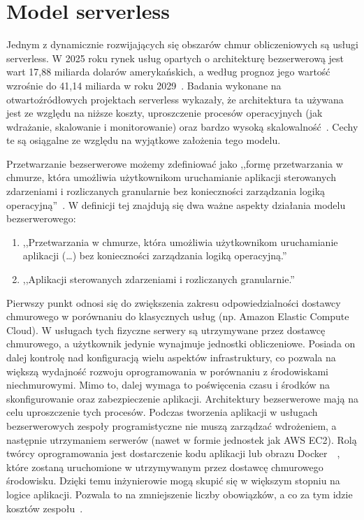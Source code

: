 \label{chapter:wstep}

\section{Model serverless}\label{chapter:model_serverless}
Jednym z dynamicznie rozwijających się obszarów chmur obliczeniowych są usługi serverless. W 2025 roku rynek usług opartych o architekturę bezserwerową jest wart 17,88 miliarda dolarów amerykańskich, a według prognoz jego wartość wzrośnie do 41,14 miliarda w roku 2029~\cite{serverlessArchitectureMarketReport}. Badania wykonane na otwartoźródłowych projektach serverless wykazały, że architektura ta używana jest ze względu na niższe koszty, uproszczenie procesów operacyjnych (jak wdrażanie, skalowanie i monitorowanie) oraz bardzo wysoką skalowalność~\cite{ServerlessApplicationsWhyWhenAndHow}. Cechy te są osiągalne ze względu na wyjątkowe założenia tego modelu.

Przetwarzanie bezserwerowe możemy zdefiniować jako ,,formę przetwarzania w chmurze, która umożliwia użytkownikom uruchamianie aplikacji sterowanych zdarzeniami i rozliczanych granularnie bez konieczności zarządzania logiką operacyjną''~\cite{SpecRgCloudGroupVisionOnThePerformanceChallengesOfFaas}. W definicji tej znajdują się dwa ważne aspekty działania modelu bezserwerowego:

\begin{enumerate}
    \item ,,Przetwarzania w chmurze, która umożliwia użytkownikom uruchamianie aplikacji (\dots) bez konieczności zarządzania logiką operacyjną.''
    \item ,,Aplikacji sterowanych zdarzeniami i rozliczanych granularnie.''
\end{enumerate}

Pierwszy punkt odnosi się do zwiększenia zakresu odpowiedzialności dostawcy chmurowego w porównaniu do klasycznych usług (np. Amazon Elastic Compute Cloud). W usługach tych fizyczne serwery są utrzymywane przez dostawcę chmurowego, a użytkownik jedynie wynajmuje jednostki obliczeniowe. Posiada on dalej kontrolę nad konfiguracją wielu aspektów infrastruktury, co pozwala na większą wydajność rozwoju oprogramowania w porównaniu z środowiskami niechmurowymi. Mimo to, dalej wymaga to poświęcenia czasu i środków na skonfigurowanie oraz zabezpieczenie aplikacji. Architektury bezserwerowe mają na celu uproszczenie tych procesów. Podczas tworzenia aplikacji w usługach bezserwerowych zespoły programistyczne nie muszą zarządzać wdrożeniem, a następnie utrzymaniem serwerów (nawet w formie jednostek jak AWS EC2). Rolą twórcy oprogramowania jest dostarczenie kodu aplikacji lub obrazu Docker~\cite{awsLambdaDocs}~\cite{awsEcsDevGuide}, które zostaną uruchomione w utrzymywanym przez dostawcę chmurowego środowisku. Dzięki temu inżynierowie mogą skupić się w większym stopniu na logice aplikacji. Pozwala to na zmniejszenie liczby obowiązków, a co za tym idzie kosztów zespołu~\cite{riseOfThePlanetOfServerlessComputing}. 

